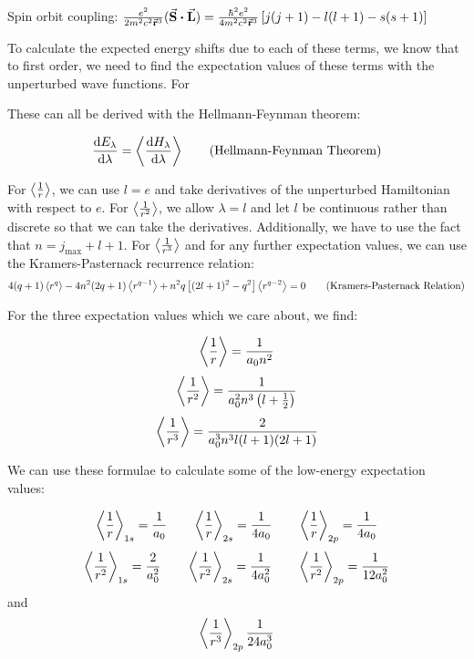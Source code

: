 \documentclass[a4paper,twoside,master.tex]{subfiles}
\begin{document}
Spin orbit coupling: $ \frac{e^2}{2 m^2 c^2 \va{r}^3} (\va{S} \vdot \va{L}) = \frac{\hbar^2 e^2}{4 m^2 c^2 \va{r}^3} \left[ j(j+1) - l(l+1) - s(s+1) \right] $

To calculate the expected energy shifts due to each of these terms, we know that to first order, we need to find the expectation values of these terms with the unperturbed wave functions. For


These can all be derived with the Hellmann-Feynman theorem:
\begin{theorem}
    \begin{equation}\label{eq:hellmann_feynman_theorem}
        \dv{E_{\lambda}}{\lambda} = \ev{\dv{H_{\lambda}}{\lambda}}\tag{Hellmann-Feynman Theorem}
    \end{equation}
\end{theorem}

For $ \ev{\frac{1}{r}} $, we can use $ l = e $ and take derivatives of the unperturbed Hamiltonian with respect to $ e $. For $ \ev{\frac{1}{r^2}} $, we allow $ \lambda = l $ and let $ l $ be continuous rather than discrete so that we can take the derivatives. Additionally, we have to use the fact that $ n = j_{\text{max}} + l + 1 $. For $ \ev{\frac{1}{r^3}} $ and for any further expectation values, we can use the Kramers-Pasternack recurrence relation:
\begin{equation}\label{eq:kramers_pasternack_relation}
    4(q+1) \ev{r^q} - 4n^2 (2q+1) \ev{r^{q-1}} + n^2 q\left[ (2l+1)^2 - q^2 \right] \ev{r^{q-2}} = 0\tag{Kramers-Pasternack Relation}
\end{equation}

For the three expectation values which we care about, we find:

\begin{equation}
    \ev{\frac{1}{r}} = \frac{1}{a_0 n^2} 
\end{equation}
\begin{equation}
    \ev{\frac{1}{r^2}} = \frac{1}{a_0^2 n^3\left( l + \frac{1}{2} \right)}
\end{equation}
\begin{equation}
    \ev{\frac{1}{r^3}} = \frac{2}{a_0^3 n^3 l(l+1)(2l+1)}
\end{equation}

We can use these formulae to calculate some of the low-energy expectation values:

\begin{equation}
    \ev{\frac{1}{r}}_{1s} = \frac{1}{a_0} \qquad \ev{\frac{1}{r}}_{2s} = \frac{1}{4 a_0} \qquad \ev{\frac{1}{r}}_{2p} = \frac{1}{4 a_0}
\end{equation}
\begin{equation}
    \ev{\frac{1}{r^2}}_{1s} = \frac{2}{a_0^2} \qquad \ev{\frac{1}{r^2}}_{2s} = \frac{1}{4 a_0^2} \qquad \ev{\frac{1}{r^2}}_{2p} = \frac{1}{12 a_0^2}
\end{equation}
and
\begin{equation}
    \ev{\frac{1}{r^3}}_{2p} \frac{1}{24 a_0^3}
\end{equation}
\end{document}
